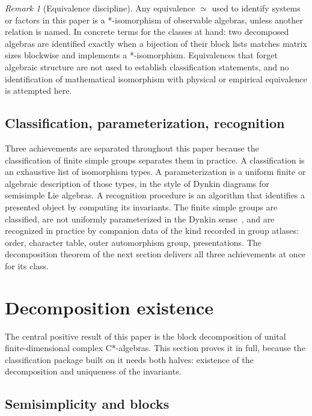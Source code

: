 \documentclass[11pt,letterpaper]{article}
\theoremstyle{definition}
\theoremstyle{remark}
\newtheorem{remark}[theorem]{Remark}
\begin{document}
\begin{remark}[Equivalence discipline]
Any equivalence $\simeq$ used to identify systems or factors in this paper is a *-isomorphism of observable algebras, unless another relation is named. In concrete terms for the classes at hand: two decomposed algebras are identified exactly when a bijection of their block lists matches matrix sizes blockwise and implements a *-isomorphism. Equivalences that forget algebraic structure are not used to establish classification statements, and no identification of mathematical isomorphism with physical or empirical equivalence is attempted here.
\end{remark}

\subsection{Classification, parameterization, recognition}

Three achievements are separated throughout this paper because the classification of finite simple groups separates them in practice. A classification is an exhaustive list of isomorphism types. A parameterization is a uniform finite or algebraic description of those types, in the style of Dynkin diagrams for semisimple Lie algebras. A recognition procedure is an algorithm that identifies a presented object by computing its invariants. The finite simple groups are classified, are not uniformly parameterized in the Dynkin sense~\cite{solomon}, and are recognized in practice by companion data of the kind recorded in group atlases: order, character table, outer automorphism group, presentations. The decomposition theorem of the next section delivers all three achievements at once for its class.

\section{Decomposition existence}
\label{sec:decomp-existence}

The central positive result of this paper is the block decomposition of unital finite-dimensional complex C*-algebras. This section proves it in full, because the classification package built on it needs both halves: existence of the decomposition and uniqueness of the invariants.

\subsection{Semisimplicity and blocks}
\end{document}
